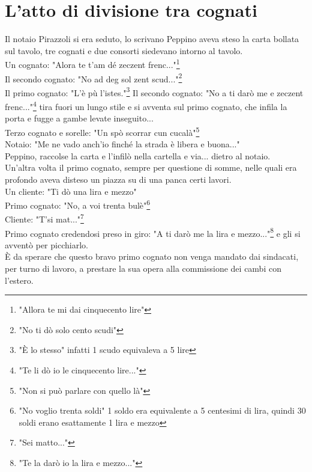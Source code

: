 
\chapter{L'atto di divisione tra cognati}
Il notaio Pirazzoli si era seduto, lo scrivano Peppino aveva steso la carta bollata sul tavolo, tre cognati e due consorti siedevano intorno al tavolo. \\
Un cognato: "Alora te t'am dé zeczent frenc..."\footnote{"Allora te mi dai cinquecento lire"}\\
Il secondo cognato: "No ad deg sol zent scud..."\footnote{"No ti dò solo cento scudi"}\\
Il primo cognato: "L'è pù l'istes."\footnote{"È lo stesso" infatti 1 scudo equivaleva a 5 lire}
Il secondo cognato: "No a ti darò me e zeczent frenc..."\footnote{"Te li dò io le cinquecento lire..."} tira fuori un lungo stile e si avventa sul primo cognato, che infila la porta e fugge a gambe levate inseguito...\\
Terzo cognato e sorelle: "Un spò scorrar cun cucalà"\footnote{"Non si può parlare con quello là"}\\
Notaio: "Me ne vado anch'io finché la strada è libera e buona..."\\
Peppino, raccolse la carta e l'infilò nella cartella e via... dietro al notaio.\\
Un'altra volta il primo cognato, sempre per questione di somme, nelle quali era profondo aveva disteso un piazza su di una panca certi lavori.\\
Un cliente: "Ti dò una lira e mezzo"\\
Primo cognato: "No, a voi trenta bulè"\footnote{"No voglio trenta soldi" 1 soldo era equivalente a 5 centesimi di lira, quindi 30 soldi erano esattamente 1 lira e mezzo}\\
Cliente: "T'si mat..."\footnote{"Sei matto..."}\\
Primo cognato credendosi preso in giro: "A ti darò me la lira e mezzo..."\footnote{"Te la darò io la lira e mezzo..."} e gli si avventò per picchiarlo.\\
È da sperare che questo bravo primo cognato non venga mandato dai sindacati, per turno di lavoro, a prestare la sua opera alla commissione dei cambi con l'estero.\\

